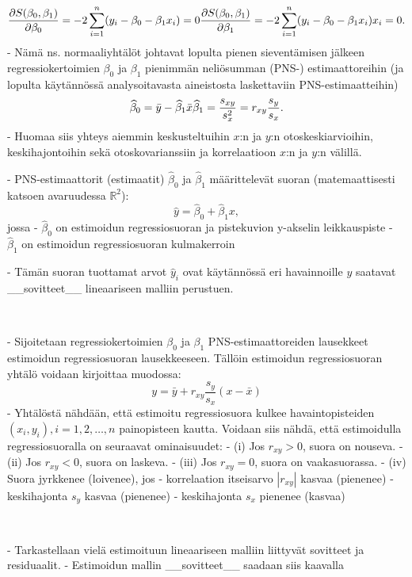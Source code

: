 \documentclass[
]{book}
\begin{document}
\begin{itemize}
$$
\frac{\partial S(\beta_0,\beta_1)}{\partial \beta_0} = -2 \sum_{i=1}^{n} (y_i - \beta_0 - \beta_1 x_i) = 0 \\
\frac{\partial S(\beta_0,\beta_1)}{\partial \beta_1}= -2 \sum_{i=1}^{n} (y_i - \beta_0 - \beta_1 x_i) x_i = 0. 
$$
- Nämä ns. normaaliyhtälöt johtavat lopulta pienen sieventämisen jälkeen regressiokertoimien $\beta_0$ ja $\beta_1$ pienimmän neliösumman (PNS-) estimaattoreihin (ja lopulta käytännössä analysoitavasta aineistosta laskettaviin PNS-estimaatteihin)
$$
\widehat{\beta}_0 = \bar{y} - \widehat{\beta}_1 \bar{x} \\
\widehat{\beta}_1 = \frac{s_{xy}}{s^2_x} = r_{xy} \frac{s_y}{s_x}.
$$
  - Huomaa siis yhteys aiemmin keskusteltuihin $x$:n ja $y$:n otoskeskiarvioihin, keskihajontoihin sekä otoskovarianssiin ja korrelaatioon $x$:n ja $y$:n välillä.

- PNS-estimaattorit (estimaatit) $\widehat{\beta}_0$ ja $\widehat{\beta}_1$ määrittelevät suoran (matemaattisesti katsoen avaruudessa $\mathbb{R}^2$): 
$$
    \widehat{y} = \widehat{\beta}_0 + \widehat{\beta}_1 x,
$$
jossa
  - $\widehat{\beta}_0$ on estimoidun regressiosuoran ja pistekuvion y-akselin leikkauspiste
  - $\widehat{\beta}_1$ on estimoidun regressiosuoran kulmakerroin

- Tämän suoran tuottamat arvot $\widehat{y}_i$ ovat käytännössä eri havainnoille $y$ saatavat __sovitteet__ lineaariseen malliin perustuen.

\
\

- Sijoitetaan regressiokertoimien $\beta_0$ ja $\beta_1$ PNS-estimaattoreiden lausekkeet estimoidun regressiosuoran lausekkeeseen. Tällöin estimoidun regressiosuoran yhtälö voidaan kirjoittaa muodossa:
$$
y = \bar{y} + r_{xy} \frac{s_y}{s_x} (x-\bar{x})
$$
  - Yhtälöstä nähdään, että estimoitu regressiosuora kulkee havaintopisteiden $(x_i , y_i), i = 1,2, \ldots, n$ painopisteen kautta. Voidaan siis nähdä, että estimoidulla regressiosuoralla on seuraavat ominaisuudet:
    - (i) Jos $r_{xy} > 0$, suora on nouseva.
    - (ii) Jos $r_{xy} < 0$, suora on laskeva.
    - (iii) Jos $r_{xy} = 0$, suora on vaakasuorassa.
    - (iv) Suora jyrkkenee (loivenee), jos
      - korrelaation itseisarvo $|r_{xy}|$ kasvaa (pienenee)
      - keskihajonta $s_y$ kasvaa (pienenee)
      - keskihajonta $s_x$ pienenee (kasvaa)

\
\

- Tarkastellaan vielä estimoituun lineaariseen malliin liittyvät sovitteet ja residuaalit.
  - Estimoidun mallin __sovitteet__ saadaan siis kaavalla


\end{itemize}
\end{document}

